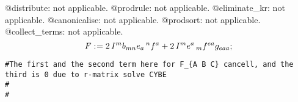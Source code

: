 \documentclass[11pt]{article}
\def\specialcolon{\mathrel{\mathop{:}}\hspace{-.5em}}
\begin{document}
@distribute: not applicable.
@prodrule: not applicable.
@eliminate\_kr: not applicable.
@canonicalise: not applicable.
@prodsort: not applicable.
@collect\_terms: not applicable.
\begin{dmath*}[compact, spread=2pt]
F\specialcolon{}= 2\, {I}^{m} {b}_{m n} {e}_{a}\,^{n} {f}^{a} + 2\, {I}^{m} {e}^{a}\,_{m} {f}^{ea} {g}_{ea a};
\end{dmath*}
{\color[named]{Blue}\begin{verbatim}
#The first and the second term here for F_{A B C} cancell, and the third is 0 due to r-matrix solve CYBE
#
#
\end{verbatim}}
\end{document}
